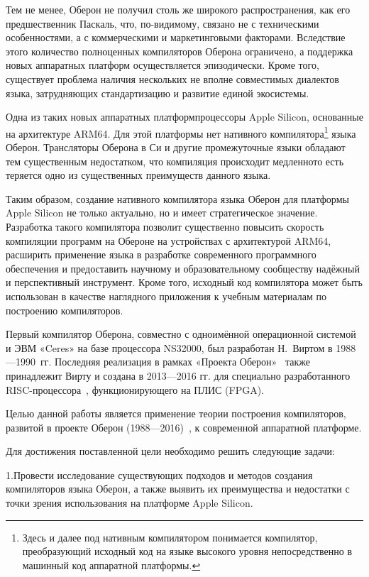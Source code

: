 \documentclass[utf8]{lgu}
\newcommand{\tire}{\unskip\nobreak\thinspace\textemdash\thinspace}
\begin{document}
Тем не менее, Оберон не получил столь же широкого распространения, как его предшественник Паскаль, что, по-видимому, связано не с техническими особенностями, а с коммерческими и маркетинговыми факторами. Вследствие этого количество полноценных компиляторов Оберона ограничено, а поддержка новых аппаратных платформ осуществляется эпизодически. Кроме того, существует проблема наличия нескольких не вполне совместимых диалектов языка, затрудняющих стандартизацию и развитие единой экосистемы.

Одна из таких новых аппаратных платформ\tire процессоры Apple Silicon, основанные на архитектуре ARM64. Для этой платформы нет нативного компилятора\footnote{Здесь и далее под нативным компилятором понимается компилятор, преобразующий исходный код на языке высокого уровня непосредственно в машинный код аппаратной платформы.} языка Оберон. Трансляторы Оберона в Си и другие промежуточные языки обладают тем существенным недостатком, что компиляция происходит медленно\tire то есть теряется одно из существенных преимуществ данного языка.

Таким образом, создание нативного компилятора языка Оберон для платформы Apple Silicon не только актуально, но и имеет стратегическое значение. Разработка такого компилятора позволит существенно повысить скорость компиляции программ на Обероне на устройствах с архитектурой ARM64, расширить применение языка в разработке современного программного обеспечения и предоставить научному и образовательному сообществу надёжный и перспективный инструмент. Кроме того, исходный код компилятора может быть использован в качестве наглядного приложения к учебным материалам по построению компиляторов.

Первый компилятор Оберона, совместно с одноимённой операционной системой и ЭВМ «Ceres» на базе процессора NS32000, был разработан Н.~Виртом в 1988---1990~гг. Последняя реализация в рамках «Проекта Оберон»~\cite{ProjectOberon1,ProjectOberon2} также принадлежит Вирту и создана в 2013---2016 гг. для специально разработанного RISC-процессора~\cite{WirthRISC}, функционирующего на ПЛИС (FPGA).

Целью данной работы является применение теории построения компиляторов, развитой в проекте Оберон (1988---2016)~\cite{WirthOberon}, к современной аппаратной платформе.

Для достижения поставленной цели необходимо решить следующие задачи:

1.\hspace{0.5em}Провести исследование существующих подходов и методов создания компиляторов языка Оберон, а также выявить их преимущества и недостатки с точки зрения использования на платформе Apple Silicon.
\end{document}
